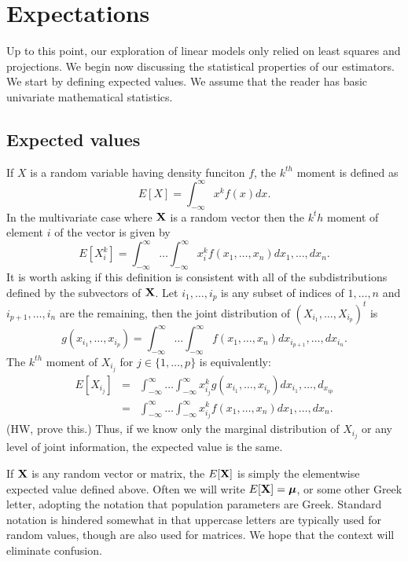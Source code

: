 \chapter{Expectations}
Up to this point, our exploration of linear models only relied on least squares
and projections. We begin now discussing the statistical properties of our
estimators. We start by defining expected values. We assume that the reader
has basic univariate mathematical statistics.

\section{Expected values}
If $X$ is a random variable having density funciton $f$, 
the $k^{th}$ moment is defined as 
$$
E[X] = \int_{-\infty}^{\infty} x^k f(x) dx.
$$
In the multivariate case where $\mathbf{X}$ is a random vector
then the $k^th$ moment of element $i$ of the vector is 
given by 
$$
E[X_i^k] = \int_{-\infty}^{\infty} \ldots \int_{-\infty}^{\infty} x_i^k f(x_1, \ldots, x_n) dx_1, \ldots, dx_n.
$$
It is worth asking if this definition is consistent with all
of the subdistributions defined by the subvectors of $\mathbf{X}$. 
Let $i_1, \ldots, i_p$ is any subset of indices of $1,\ldots, n$ and
$i_{p+1}, \ldots, i_{n}$ are the remaining, then the 
joint distribution of $(X_{i_1},\ldots, X_{i_p})^t$ is 
$$
g(x_{i_1}, \ldots, x_{i_p}) = \int_{-\infty}^{\infty} \ldots \int_{-\infty}^{\infty}
f(x_1, \ldots, x_n) dx_{i_{p+1}}, \ldots, dx_{i_{n}}.
$$
The $k^{th}$ moment of $X_{i_j}$ for $j \in \{1,\ldots, p\}$ is equivalently:
\begin{eqnarray*}
E[X_{i_j}] & = & \int_{-\infty}^{\infty} \ldots \int_{-\infty}^{\infty}
x_{i_j}^k g(x_{i_1}, \ldots, x_{i_p}) dx_{i_1}, \ldots, d_{x_{ip}} \\
& = & \int_{-\infty}^{\infty} \ldots \int_{-\infty}^{\infty}
x_{i_j}^k f(x_1, \ldots, x_n) dx_1, \ldots, dx_n.
\end{eqnarray*}
(HW, prove this.) Thus, if we know only the marginal distribution 
of $X_{i_j}$ or any level of joint information, the expected value is the same.


If $\mathbf{X}$ is any random vector or matrix, the $E[\mathbf{X}]$ is 
simply the elementwise expected value defined above. Often
we will write $E[\mathbf{X}] = \boldsymbol{\mu}$, or some other Greek letter,
adopting the notation that population parameters are Greek.
Standard notation is hindered somewhat in that uppercase letters
are typically used for random values, though are also used
for matrices. We hope that the context will eliminate confusion.


